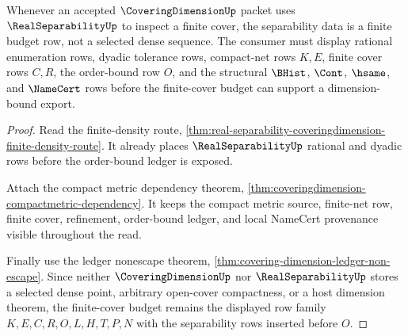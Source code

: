 \begin{theorem}
\label{thm:coveringdimension-real-separability-finite-cover-budget}
Whenever an accepted $\CoveringDimensionUp$ packet uses $\RealSeparabilityUp$ to inspect a finite cover, the separability data is a finite budget row, not a selected dense sequence. The consumer must display rational enumeration rows, dyadic tolerance rows, compact-net rows $K,E$, finite cover rows $C,R$, the order-bound row $O$, and the structural $\BHist$, $\Cont$, $\hsame$, and $\NameCert$ rows before the finite-cover budget can support a dimension-bound export.
\end{theorem}
\begin{proof}
Read the finite-density route, \autoref{thm:real-separability-coveringdimension-finite-density-route}. It already places $\RealSeparabilityUp$ rational and dyadic rows before the order-bound ledger is exposed.

Attach the compact metric dependency theorem, \autoref{thm:coveringdimension-compactmetric-dependency}. It keeps the compact metric source, finite-net row, finite cover, refinement, order-bound ledger, and local NameCert provenance visible throughout the read.

Finally use the ledger nonescape theorem, \autoref{thm:covering-dimension-ledger-non-escape}. Since neither $\CoveringDimensionUp$ nor $\RealSeparabilityUp$ stores a selected dense point, arbitrary open-cover compactness, or a host dimension theorem, the finite-cover budget remains the displayed row family $K,E,C,R,O,L,H,T,P,N$ with the separability rows inserted before $O$.
\end{proof}



